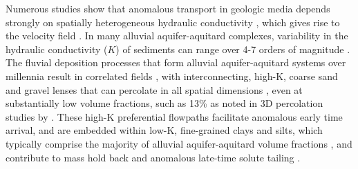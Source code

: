 Numerous studies show that anomalous transport in geologic media depends strongly on spatially heterogeneous hydraulic conductivity \citep{gelhar1993stochastic, dagan2005subsurface, de2005dealing}, which gives rise to the velocity field \citep{berkowitz2006modeling}. In many alluvial aquifer-aquitard complexes, variability in the hydraulic conductivity ($K$) of sediments can range over 4-7 orders of magnitude \citep{Fetter2001, fogg2016debates}. The fluvial deposition processes that form alluvial aquifer-aquitard systems over millennia result in correlated fields \citep{galloway2012terrigenous}, with interconnecting, high-K, coarse sand and gravel lenses \citep{fogg1986groundwater} that can percolate in all spatial dimensions \citep{fogg2000connected}, even at substantially low volume fractions, such as 13\% as noted in 3D percolation studies by \citet{harter2005finite}. These high-K preferential flowpaths facilitate anomalous early time arrival, and are embedded within low-K, fine-grained clays and silts, which typically comprise the majority of alluvial aquifer-aquitard volume fractions \citep{galloway2012terrigenous}, and contribute to mass hold back and anomalous late-time solute tailing \citep{labolle2001role, berkowitz2006modeling, haggerty2000late, benson2000application}. %

